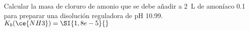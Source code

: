Calcular la masa de cloruro de amonio que se debe añadir a \SI{2}{\liter} de amoníaco \SI{0,1}{\Molar} para preparar una disolución reguladora de pH \SI{10,99}{}.
    ~~~~$K_b(\ce{NH3})=\SI{1,8e-5}{}$
